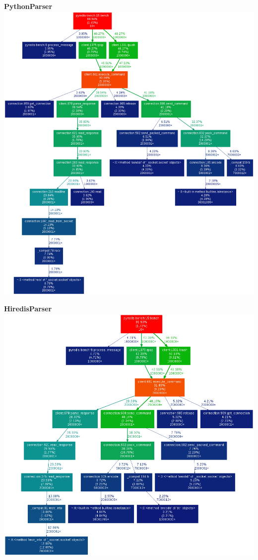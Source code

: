 \documentclass[a4paper, 11pt]{report}
\begin{document}
\begin{minipage}[t]{0.5\linewidth}
\textbf{PythonParser}\\

\includegraphics[width=0.9\linewidth]{pics/naive-py.png}
\end{minipage}
\quad
\begin{minipage}[t]{0.5\linewidth}
\textbf{HiredisParser}\\

\includegraphics[width=0.9\linewidth]{pics/naive-hi.png}
\end{minipage}
\end{document}
